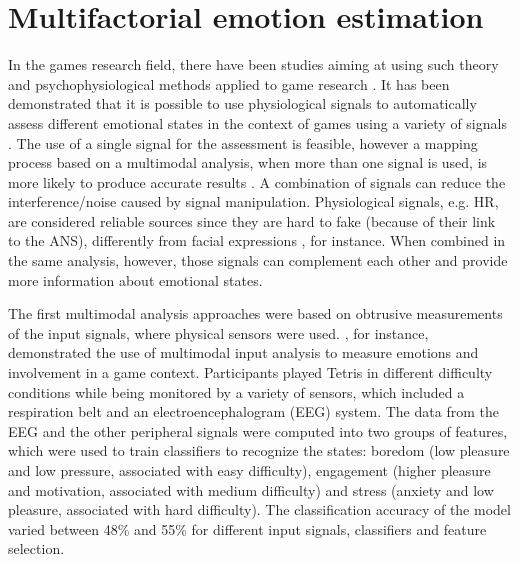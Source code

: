 \chapter{Multifactorial emotion estimation}

In the games research field, there have been studies aiming at using such theory and psychophysiological methods applied to game research \parencite{kivikangas2011review}. It has been demonstrated that it is possible to use physiological signals to automatically assess different emotional states in the context of games using a variety of signals \parencite{bousefsaf2013remote,yun2009game,rani2006empirical,tijs2008dynamic}. The use of a single signal for the assessment is feasible, however a mapping process based on a multimodal analysis, when more than one signal is used, is more likely to produce accurate results \parencite{kukolja2014comparative}. A combination of signals can reduce the interference/noise caused by signal manipulation. Physiological signals, e.g. HR, are considered reliable sources since they are hard to fake (because of their link to the ANS), differently from facial expressions \parencite{Landowska}, for instance. When combined in the same analysis, however, those signals can complement each other and provide more information about emotional states.

The first multimodal analysis approaches were based on obtrusive measurements of the input signals, where physical sensors were used. \textcite{Chanel_2011}, for instance, demonstrated the use of multimodal input analysis to measure emotions and involvement in a game context. Participants played Tetris in different difficulty conditions while being monitored by a variety of sensors, which included a respiration belt and an electroencephalogram (EEG) system. The data from the EEG and the other peripheral signals were computed into two groups of features, which were used to train classifiers to recognize the states: boredom (low pleasure and low pressure, associated with easy difficulty), engagement (higher pleasure and motivation, associated with medium difficulty) and stress (anxiety and low pleasure, associated with hard difficulty). The classification accuracy of the model varied between 48\% and 55\% for different input signals, classifiers and feature selection.

